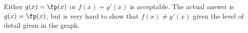 {\begin{minipage}{\linewidth}
\end{minipage}
}
{Either $g(x) = \fp(x)$ or $f(x) = g'(x)$ is acceptable. The actual answer is $g(x) = \fp(x)$, but is very hard to show that $f(x)\neq g'(x)$ given the level of detail given in the graph. 
}
